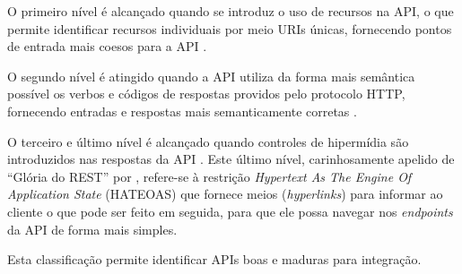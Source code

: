       O primeiro nível é alcançado quando se introduz o uso de recursos na API,
      o que permite identificar recursos individuais por meio URIs únicas,
      fornecendo pontos de entrada mais coesos para a API \cite{fowler10} \cite{richardson09}.
      
      O segundo nível é atingido quando a API utiliza da forma mais semântica possível
      os verbos e códigos de respostas providos pelo protocolo HTTP,
      fornecendo entradas e respostas mais semanticamente corretas \cite{fowler10} \cite{richardson09}.
      
      O terceiro e último nível é alcançado quando controles de hipermídia
      são introduzidos nas respostas da API \cite{fowler10} \cite{richardson09}.
      Este último nível, carinhosamente apelido de ``Glória do REST'' por \cite{fowler10},
      refere-se à restrição \textit{Hypertext As The Engine Of Application State} (HATEOAS) 
      que fornece meios (\textit{hyperlinks}) para informar ao cliente o que pode ser feito em seguida,
      para que ele possa navegar nos \textit{endpoints} da API de forma mais simples.
      
      Esta classificação permite identificar APIs boas e maduras para integração.
      